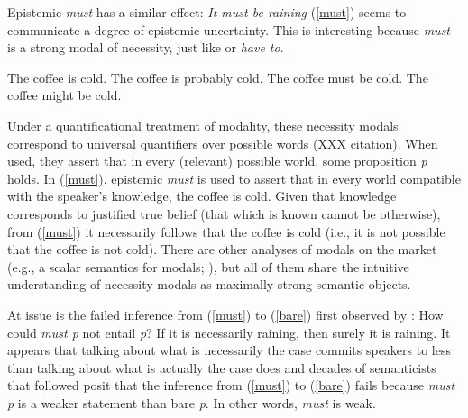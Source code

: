 \documentclass[11pt]{article}
\begin{document}
Epistemic \emph{must} has a similar effect: \emph{It must be raining} (\ref{must}) seems to communicate a degree of epistemic uncertainty. This is interesting because \emph{must} is a strong modal of necessity, just like or \emph{have to}. 

\begin{exe}
	\ex\label{english} \begin{xlist}
		\ex\label{bare} The coffee is cold.
		\ex\label{prob} The coffee is probably cold.
		\ex\label{must} The coffee must be cold.
		\ex\label{might} The coffee might be cold.
	\end{xlist}
\end{exe}


Under a quantificational treatment of modality, these necessity modals correspond to universal quantifiers over possible words (XXX citation). When used, they assert that in every (relevant) possible world, some proposition \emph{p} holds. In (\ref{must}), epistemic \emph{must} is used to assert that in every world compatible with the speaker's knowledge, the coffee is cold. Given that knowledge corresponds to justified true belief (that which is known cannot be otherwise), from (\ref{must}) it necessarily follows that the coffee is cold (i.e., it is not possible that the coffee is not cold). There are other analyses of modals on the market (e.g., a scalar semantics for modals; \cite{lassiter2011}), but all of them share the intuitive understanding of necessity modals as maximally strong semantic objects.

At issue is the failed inference from (\ref{must}) to (\ref{bare}) first observed by \cite{karttunen1972}: How could \emph{must p} not entail \emph{p}? If it is necessarily raining, then surely it is raining. It appears that talking about what is necessarily the case commits speakers to less than talking about what is actually the case does \cite{karttunen1972} and decades of semanticists that followed posit that the inference from (\ref{must}) to (\ref{bare}) fails because \emph{must p} is a weaker statement than bare \emph{p}. In other words, \emph{must} is weak. 
\end{document}
